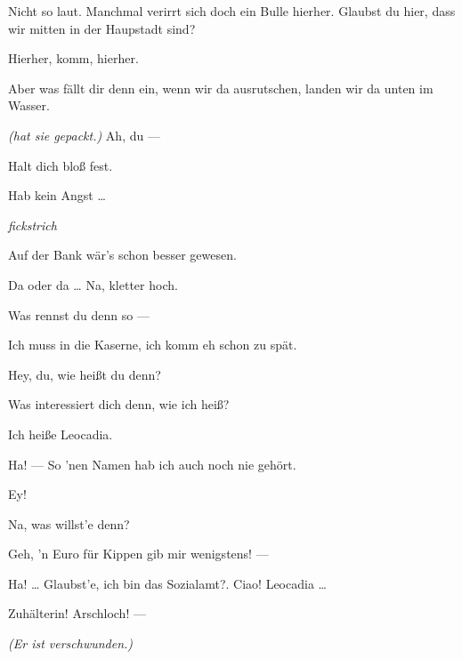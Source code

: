\documentclass[
	final,
	a4paper,
	ngerman,
	mpinclude = true, %
	twoside = true,
	open = right,
	cleardoublepage = plain,
	DIV = 13,
	BCOR = 1cm,
	titlepage = firstiscover,
	]{scrbook}
\newcommand{\direction}[1]{\textit{(#1)}}
\newcommand{\hiat}{%
	\begin{center}
		\tiny
		\raisebox{0.5ex}{\rule{0.3\linewidth}{0.4pt}}
		\textit{fickstrich}
		\raisebox{0.5ex}{\rule{0.3\linewidth}{0.4pt}}
	\end{center}
}
\newcommand{\thecharacter}[1]{\textup{\textsc{#1}}\xspace}
\newcommand{\thenutte}{\thecharacter{Leocadia}}
\newcommand{\thesoldatin}{\thecharacter{Franziska}}
\newcommand{\character}[1]{\item[#1:]}
\newcommand{\nutte}{\character{\thenutte}}
\newcommand{\soldatin}{\character{\thesoldatin}}
\begin{document}
\begin{play}
	\nutte
	Nicht so laut. Manchmal verirrt sich doch ein Bulle hierher. Glaubst du hier, dass wir mitten in der Haupstadt sind?

	\soldatin
	Hierher, komm, hierher.

	\nutte
	Aber was fällt dir denn ein, wenn wir da ausrutschen, landen wir da unten im Wasser.

	\soldatin
	\direction{hat sie gepackt.} Ah, du ---

	\nutte
	Halt dich bloß fest.

	\soldatin
	Hab kein Angst \ldots{}

	\hiat

	\nutte
	Auf der Bank wär's schon besser gewesen.

	\soldatin
	Da oder da \ldots{} Na, kletter hoch.

	\nutte
	Was rennst du denn so ---

	\soldatin
	Ich muss in die Kaserne, ich komm eh schon zu spät.

	\nutte
	Hey, du, wie heißt du denn?

	\soldatin
	Was interessiert dich denn, wie ich heiß?

	\nutte
	Ich heiße Leocadia.

	\soldatin
	Ha! --- So 'nen Namen hab ich auch noch nie gehört.

	\nutte
	Ey!

	\soldatin
	Na, was willst'e denn?

	\nutte
	Geh, 'n Euro für Kippen gib mir wenigstens! ---

	\soldatin
	Ha! \ldots{} Glaubst'e, ich bin das Sozialamt?. Ciao! Leocadia \ldots{}

	\nutte
	Zuhälterin! Arschloch! ---

	\direction{Er ist verschwunden.}

\end{play}
\end{document}
